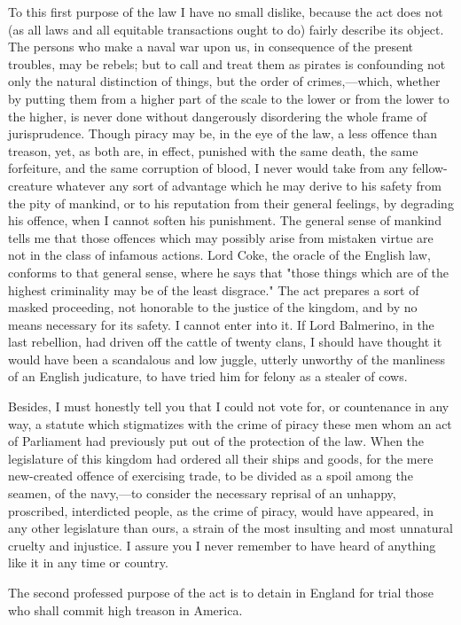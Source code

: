 To this first purpose of the law I have no small dislike, because the act does not (as all laws and all equitable transactions ought to do) fairly describe its object. The persons who make a naval war upon us, in consequence of the present troubles, may be rebels; but to call and treat them as pirates is confounding not only the natural distinction of things, but the order of crimes,—which, whether by putting them from a higher part of the scale to the lower or from the lower to the higher, is never done without dangerously disordering the whole frame of jurisprudence. Though piracy may be, in the eye of the law, a less offence than treason, yet, as both are, in effect, punished with the same death, the same forfeiture, and the same corruption of blood, I never would take from any fellow-creature whatever any sort of advantage which he may derive to his safety from the pity of mankind, or to his reputation from their general feelings, by degrading his offence, when I cannot soften his punishment. The general sense of mankind tells me that those offences which may possibly arise from mistaken virtue are not in the class of infamous actions. Lord Coke, the oracle of the English law, conforms to that general sense, where he says that "those things which are of the highest criminality may be of the least disgrace." The act prepares a sort of masked proceeding, not honorable to the justice of the kingdom, and by no means necessary for its safety. I cannot enter into it. If Lord Balmerino, in the last rebellion, had driven off the cattle of twenty clans, I should have thought it would have been a scandalous and low juggle, utterly unworthy of the manliness of an English judicature, to have tried him for felony as a stealer of cows.

Besides, I must honestly tell you that I could not vote for, or countenance in any way, a statute which stigmatizes with the crime of piracy these men whom an act of Parliament had previously put out of the protection of the law. When the legislature of this kingdom had ordered all their ships and goods, for the mere new-created offence of exercising trade, to be divided as a spoil among the seamen, of the navy,—to consider the necessary reprisal of an unhappy, proscribed, interdicted people, as the crime of piracy, would have appeared, in any other legislature than ours, a strain of the most insulting and most unnatural cruelty and injustice. I assure you I never remember to have heard of anything like it in any time or country.

The second professed purpose of the act is to detain in England for trial those who shall commit high treason in America.

